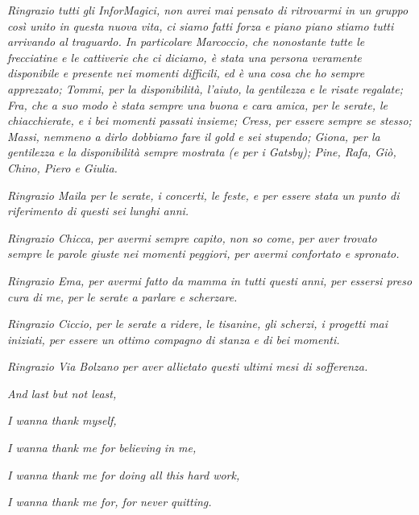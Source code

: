 \documentclass[a4paper,12pt]{report}
\begin{document}
\noindent \textit{Ringrazio tutti gli InforMagici, non avrei mai pensato di ritrovarmi in un gruppo così unito in questa nuova vita, ci siamo fatti forza e piano piano stiamo tutti arrivando al traguardo. In particolare Marcoccio, che nonostante tutte le frecciatine e le cattiverie che ci diciamo, è stata una persona veramente disponibile e presente nei momenti difficili, ed è una cosa che ho sempre apprezzato; Tommi, per la disponibilità, l'aiuto, la gentilezza e le risate regalate; Fra, che a suo modo è stata sempre una buona e cara amica, per le serate, le chiacchierate, e i bei momenti passati insieme; Cress, per essere sempre se stesso; Massi, nemmeno a dirlo dobbiamo fare il gold e sei stupendo; Giona, per la gentilezza e la disponibilità sempre mostrata (e per i Gatsby); Pine, Rafa, Giò, Chino, Piero e Giulia.}
\bigskip

\noindent \textit{Ringrazio Maila per le serate, i concerti, le feste, e per essere stata un punto di riferimento di questi sei lunghi anni.}
\bigskip

\noindent \textit{Ringrazio Chicca, per avermi sempre capito, non so come, per aver trovato sempre le parole giuste nei momenti peggiori, per avermi confortato e spronato.}
\bigskip

\noindent \textit{Ringrazio Ema, per avermi fatto da mamma in tutti questi anni, per essersi preso cura di me, per le serate a parlare e scherzare.}
\bigskip

\noindent \textit{Ringrazio Ciccio, per le serate a ridere, le tisanine, gli scherzi, i progetti mai iniziati, per essere un ottimo compagno di stanza e di bei momenti.}
\bigskip

\noindent \textit{Ringrazio Via Bolzano per aver allietato questi ultimi mesi di sofferenza.}
\bigskip

\noindent \textit{And last but not least,}

\noindent \textit{I wanna thank myself,}

\noindent \textit{I wanna thank me for believing in me,}

\noindent \textit{I wanna thank me for doing all this hard work,}

\noindent \textit{I wanna thank me for, for never quitting.}

%
%



\end{document}
